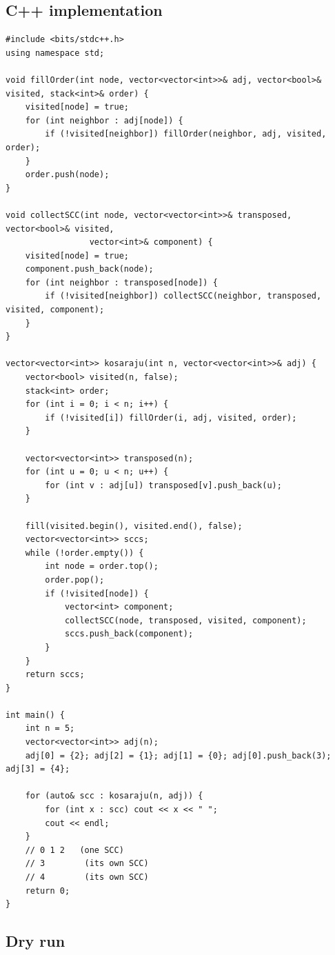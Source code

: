 \subsection*{C++ implementation}

\begin{lstlisting}
#include <bits/stdc++.h>
using namespace std;

void fillOrder(int node, vector<vector<int>>& adj, vector<bool>& visited, stack<int>& order) {
    visited[node] = true;
    for (int neighbor : adj[node]) {
        if (!visited[neighbor]) fillOrder(neighbor, adj, visited, order);
    }
    order.push(node);
}

void collectSCC(int node, vector<vector<int>>& transposed, vector<bool>& visited,
                 vector<int>& component) {
    visited[node] = true;
    component.push_back(node);
    for (int neighbor : transposed[node]) {
        if (!visited[neighbor]) collectSCC(neighbor, transposed, visited, component);
    }
}

vector<vector<int>> kosaraju(int n, vector<vector<int>>& adj) {
    vector<bool> visited(n, false);
    stack<int> order;
    for (int i = 0; i < n; i++) {
        if (!visited[i]) fillOrder(i, adj, visited, order);
    }

    vector<vector<int>> transposed(n);
    for (int u = 0; u < n; u++) {
        for (int v : adj[u]) transposed[v].push_back(u);
    }

    fill(visited.begin(), visited.end(), false);
    vector<vector<int>> sccs;
    while (!order.empty()) {
        int node = order.top();
        order.pop();
        if (!visited[node]) {
            vector<int> component;
            collectSCC(node, transposed, visited, component);
            sccs.push_back(component);
        }
    }
    return sccs;
}

int main() {
    int n = 5;
    vector<vector<int>> adj(n);
    adj[0] = {2}; adj[2] = {1}; adj[1] = {0}; adj[0].push_back(3); adj[3] = {4};

    for (auto& scc : kosaraju(n, adj)) {
        for (int x : scc) cout << x << " ";
        cout << endl;
    }
    // 0 1 2   (one SCC)
    // 3        (its own SCC)
    // 4        (its own SCC)
    return 0;
}
\end{lstlisting}

\subsection*{Dry run}

